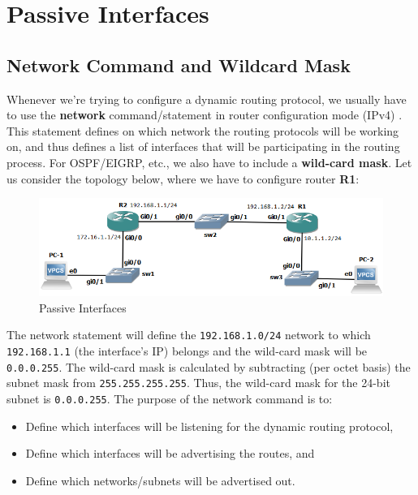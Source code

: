 \section{Passive Interfaces}
\subsection{Network Command and Wildcard Mask}
Whenever we're trying to configure a dynamic routing protocol, we usually have to use the \textbf{network} command/statement in router configuration mode (IPv4) . This statement defines on which network the routing protocols will be working on, and thus defines a list of interfaces that will be participating in the routing process. For OSPF/EIGRP, etc., we also have to include a \textbf{wild-card mask}. Let us consider the topology below, where we have to configure router \textbf{R1}:  

\begin{figure}[H]
\centering
\includegraphics[width=0.9\linewidth]{"ICND1/2. Routers/chapters/9.8.a Passive Interfaces"}
\caption{Passive Interfaces}
\label{fig:9.8.a}
\end{figure}
\vspace{-10pt}

\noindent
The network statement will define the \verb|192.168.1.0/24| network to which \verb|192.168.1.1| (the interface's IP)  belongs and the wild-card mask will be \verb|0.0.0.255|. The wild-card mask is calculated by subtracting (per octet basis) the subnet mask from \verb|255.255.255.255|. Thus, the wild-card mask for the 24-bit subnet is \verb|0.0.0.255|. The purpose of the network command is to:

\vspace{-10pt}
\noindent
\begin{itemize}
\item Define which interfaces will be listening for the dynamic routing protocol,
\item Define which interfaces will be advertising the routes, and 
\item Define which networks/subnets will be advertised out. 
\end{itemize}

